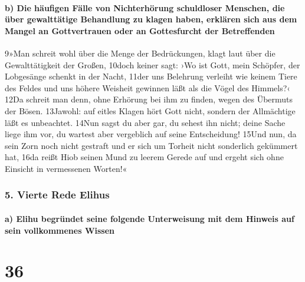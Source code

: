 \hypertarget{b-die-huxe4ufigen-fuxe4lle-von-nichterhuxf6rung-schuldloser-menschen-die-uxfcber-gewalttuxe4tige-behandlung-zu-klagen-haben-erkluxe4ren-sich-aus-dem-mangel-an-gottvertrauen-oder-an-gottesfurcht-der-betreffenden}{%
\paragraph{b) Die häufigen Fälle von Nichterhörung schuldloser Menschen,
die über gewalttätige Behandlung zu klagen haben, erklären sich aus dem
Mangel an Gottvertrauen oder an Gottesfurcht der
Betreffenden}\label{b-die-huxe4ufigen-fuxe4lle-von-nichterhuxf6rung-schuldloser-menschen-die-uxfcber-gewalttuxe4tige-behandlung-zu-klagen-haben-erkluxe4ren-sich-aus-dem-mangel-an-gottvertrauen-oder-an-gottesfurcht-der-betreffenden}}

9»Man schreit wohl über die Menge der Bedrückungen, klagt laut über die
Gewalttätigkeit der Großen, 10doch keiner sagt: ›Wo ist Gott, mein
Schöpfer, der Lobgesänge schenkt in der Nacht, 11der uns Belehrung
verleiht wie keinem Tiere des Feldes und uns höhere Weisheit gewinnen
läßt als die Vögel des Himmels?‹ 12Da schreit man denn, ohne Erhörung
bei ihm zu finden, wegen des Übermuts der Bösen. 13Jawohl: auf eitles
Klagen hört Gott nicht, sondern der Allmächtige läßt es unbeachtet.
14Nun sagst du aber gar, du sehest ihn nicht; deine Sache liege ihm vor,
du wartest aber vergeblich auf seine Entscheidung! 15Und nun, da sein
Zorn noch nicht gestraft und er sich um Torheit nicht sonderlich
gekümmert hat, 16da reißt Hiob seinen Mund zu leerem Gerede auf und
ergeht sich ohne Einsicht in vermessenen Worten!«

\hypertarget{vierte-rede-elihus}{%
\subsubsection{5. Vierte Rede Elihus}\label{vierte-rede-elihus}}

\hypertarget{a-elihu-begruxfcndet-seine-folgende-unterweisung-mit-dem-hinweis-auf-sein-vollkommenes-wissen}{%
\paragraph{a) Elihu begründet seine folgende Unterweisung mit dem
Hinweis auf sein vollkommenes
Wissen}\label{a-elihu-begruxfcndet-seine-folgende-unterweisung-mit-dem-hinweis-auf-sein-vollkommenes-wissen}}

\hypertarget{section-35}{%
\section{36}\label{section-35}}

